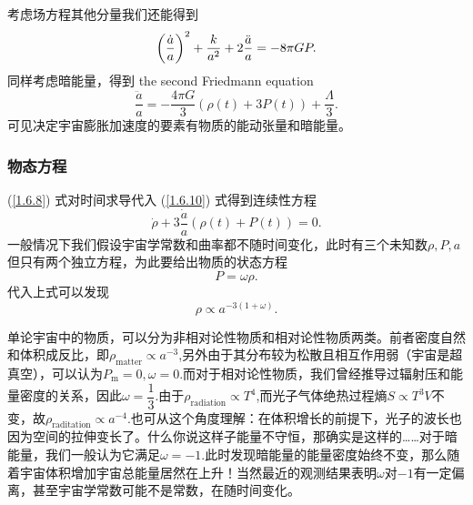 \documentclass[../天体物理基础.tex]{subfiles}
\begin{document}
考虑场方程其他分量我们还能得到
\begin{equation}
\left(\frac{\dot{a}}{a}\right)^{2}+\frac{k}{a^{2}}+2\frac{\ddot{a}}{a}=-8\pi GP.\\
\end{equation}
同样考虑暗能量，得到 the second Friedmann equation
\begin{equation}
\frac{\ddot{a}}{a}=-\frac{4\pi G}{3}\left(\rho\left(t\right)+3P\left(t\right)\right)+\frac{\Lambda}{3}.\label{1.6.10}
\end{equation}
可见决定宇宙膨胀加速度的要素有物质的能动张量和暗能量。

\subsubsection{物态方程}
(\ref{1.6.8}) 式对时间求导代入 (\ref{1.6.10}) 式得到连续性方程
\begin{equation}
\dot{\rho}+3\frac{\dot{a}}{a}\left(\rho\left(t\right)+P\left(t\right)\right)=0.
\end{equation}
一般情况下我们假设宇宙学常数和曲率都不随时间变化，此时有三个未知数$\rho,P,a$但只有两个独立方程，为此要给出物质的状态方程
\begin{equation}
P=\omega\rho.
\end{equation}
代入上式可以发现
\begin{equation}
\rho\propto{}a^{-3\left(1+\omega\right)}.
\end{equation}

单论宇宙中的物质，可以分为非相对论性物质和相对论性物质两类。前者密度自然和体积成反比，即$\rho_{\text{matter}}\propto a^{-3}$,另外由于其分布较为松散且相互作用弱（宇宙是超真空），可以认为$P_{\text{m}}=0,\omega=0$.而对于相对论性物质，我们曾经推导过辐射压和能量密度的关系，因此$\omega=\dfrac{1}{3}$.由于$\rho_{\text{radiation}}\propto{}T^{4}$,而光子气体绝热过程熵$S\propto{}T^{3}V$不变，故$\rho_{\text{raditation}}\propto{}a^{-4}$.也可从这个角度理解：在体积增长的前提下，光子的波长也因为空间的拉伸变长了。什么你说这样子能量不守恒，那确实是这样的……对于暗能量，我们一般认为它满足$\omega=-1$.此时发现暗能量的能量密度始终不变，那么随着宇宙体积增加宇宙总能量居然在上升！当然最近的观测结果表明$\omega$对$-1$有一定偏离，甚至宇宙学常数可能不是常数，在随时间变化。
\end{document}
